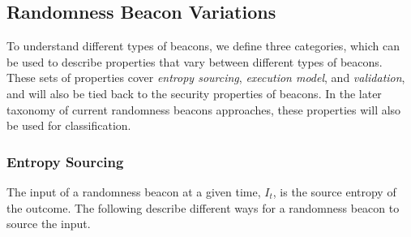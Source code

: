 \subsection{Randomness Beacon Variations}
To understand different types of beacons, we define three categories, which can be used to describe properties that vary between different types of beacons.
These sets of properties cover \emph{entropy sourcing}, \emph{execution model}, and \emph{validation}, and will also be tied back to the security properties of beacons.
In the later taxonomy of current randomness beacons approaches, these properties will also be used for classification.

\subsubsection{Entropy Sourcing}
The input of a randomness beacon at a given time, $I_t$, is the source entropy of the outcome.
The following describe different ways for a randomness beacon to source the input.
